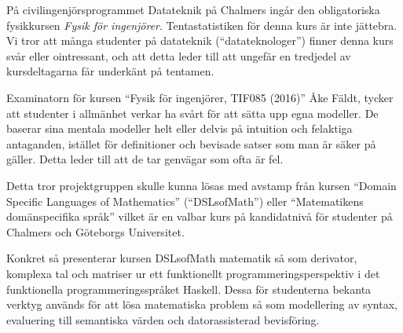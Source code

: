\begin{draft}

På civilingenjörsprogrammet Datateknik på Chalmers ingår den obligatoriska fysikkursen
\textit{Fysik för ingenjörer}.
Tentastatistiken för denna kurs är
inte jättebra\cite{tentastatistik}. Vi
tror att många studenter på datateknik (``datateknologer'') finner denna kurs
svår eller ointressant, och att detta leder till att ungefär en
tredjedel av kursdeltagarna får underkänt på tentamen.

Examinatorn för kursen ``Fysik för ingenjörer, TIF085 (2016)'' Åke Fäldt,
tycker
att studenter i allmänhet verkar ha svårt för att sätta upp egna
modeller. De baserar sina mentala modeller helt eller delvis på
intuition och felaktiga antaganden, istället för definitioner och
bevisade satser som man är säker på gäller. Detta leder till att de
tar genvägar som ofta är fel.

Detta tror projektgruppen skulle kunna lösas med avstamp från kursen ``Domain Specific Languages of
Mathematics'' (``DSLsofMath'') eller ``Matematikens domänspecifika språk''
vilket är en valbar kurs på kandidatnivå för studenter på Chalmers och
Göteborgs Universitet.

\iffalse
Domänspecifika språk, kan
förklaras som ett språk konstruerat för ett specifikt område, d.v.s. en
domän. Språket kan användas för att enklare uttrycka uttryck inom
domänen, till exempel Newtons andra lag $F=m \cdot a$, än vad som är
möjligt inom generella (programmerings) språk. Exemplet ovan kan i ett
domänspecifikt språk evalueras enklare m.h.a. ett syntaxträd och mönstermatchning,
gentemot ett generellt språk där exempelvis en rekursiv swith-case sats skulle kunna användas.
Dock med mer overhead\todo{Visa bild på syntaxträd för m * a}.
\fi

Konkret så presenterar kursen DSLsofMath matematik så som derivator, komplexa
tal och matriser ur ett
funktionellt programmeringsperspektiv i det funktionella programmeringsspråket
Haskell. Dessa för studenterna bekanta verktyg används för att lösa
matematiska problem så som modellering av syntax, evaluering till
semantiska värden och
datorassisterad bevisföring.



\end{draft}
